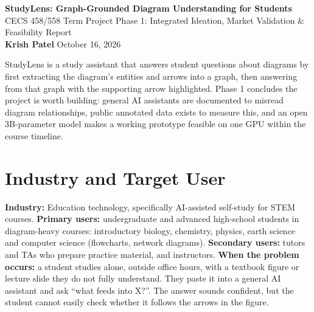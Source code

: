 \documentclass[11pt,letterpaper]{article}
\begin{document}
\begin{center}
{\Large\bfseries StudyLens: Graph-Grounded Diagram Understanding for Students}\\[3pt]
CECS 458/558 Term Project \textperiodcentered{} Phase 1: Integrated Ideation, Market Validation \& Feasibility Report\\[2pt]
\textbf{Krish Patel} \quad \textperiodcentered \quad October 16, 2026
\end{center}

StudyLens is a study assistant that answers student questions about diagrams by first extracting the diagram's entities and arrows into a graph, then answering from that graph with the supporting arrow highlighted. Phase 1 concludes the project is worth building: general AI assistants are documented to misread diagram relationships, public annotated data exists to measure this, and an open 3B-parameter model makes a working prototype feasible on one GPU within the course timeline.

\section{Industry and Target User}
\textbf{Industry:} Education technology, specifically AI-assisted self-study for STEM courses.
\textbf{Primary users:} undergraduate and advanced high-school students in diagram-heavy courses: introductory biology, chemistry, physics, earth science and computer science (flowcharts, network diagrams).
\textbf{Secondary users:} tutors and TAs who prepare practice material, and instructors.
\textbf{When the problem occurs:} a student studies alone, outside office hours, with a textbook figure or lecture slide they do not fully understand. They paste it into a general AI assistant and ask ``what feeds into X?''. The answer sounds confident, but the student cannot easily check whether it follows the arrows in the figure.
\end{document}
